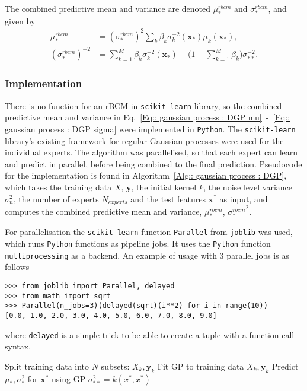 \documentclass[twoside,english]{uiofysmaster}
\begin{document}
{The combined predictive mean and variance are denoted $\mu^{rbcm}_*$ and $\sigma_*^{rbcm}$, and given by
\begin{align}
\mu_*^{rbcm} &= (\sigma_*^{rbcm})^2 \sum_k \beta_k \sigma_k^{-2} (\textbf{x}_*) \mu_k (\textbf{x}_*),\label{Eq:: gaussian process : DGP mu} \\
(\sigma_*^{rbcm})^{-2} &= \sum_{k=1}^M \beta_k \sigma_k^{-2} (\textbf{x}_*) + \big(1 - \sum_{k=1}^M \beta_k \big) \sigma_{**}^{-2}.\label{Eq:: gaussian process : DGP sigma}
\end{align}


\subsubsection{Implementation}

There is no function for an rBCM in \verb|scikit-learn| library, so the combined predictive mean and variance in Eq.~\ref{Eq:: gaussian process : DGP mu}~-~\ref{Eq:: gaussian process : DGP sigma} were implemented in \verb|Python|. The \verb|scikit-learn| library's existing framework for regular Gaussian processes were used for the individual experts. The algorithm was parallelised, so that each expert can learn and predict in parallel, before being combined to the final prediction. Pseudocode for the implementation is found in Algorithm~\ref{Alg:: gaussian process : DGP}, which takes the training data $X$, $\textbf{y}$, the initial kernel $k$, the noise level variance $\sigma_n^2$, the number of experts $N_{experts}$ and the test features $\textbf{x}^*$ as input, and computes the combined predictive mean and variance, $\mu^{rbcm}_*$, ${\sigma_*^{rbcm}}^2$.

For parallelisation the \verb|scikit-learn| function \verb|Parallel| from \verb|joblib| was used, which runs \verb|Python| functions as pipeline jobs. It uses the \verb|Python| function \verb|multiprocessing| as a backend. An example of usage with 3 parallel jobs is as follows
\begin{lstlisting}
>>> from joblib import Parallel, delayed
>>> from math import sqrt
>>> Parallel(n_jobs=3)(delayed(sqrt)(i**2) for i in range(10))
[0.0, 1.0, 2.0, 3.0, 4.0, 5.0, 6.0, 7.0, 8.0, 9.0]
\end{lstlisting}
where \verb|delayed| is a simple trick to be able to create a tuple with a function-call syntax.


\begin{algorithm}
Split training data into $N$ subsets: $X_k, \textbf{y}_k$\;
{
Fit GP to training data $X_k, \textbf{y}_k$ \;
 Predict $\mu_*,\sigma_*^2 $ for $\textbf{x}^*$ using GP \;
 $\sigma_{**}^2 = k (x^*, x^*)$ \;
}
 

\end{algorithm}}
\end{document}
